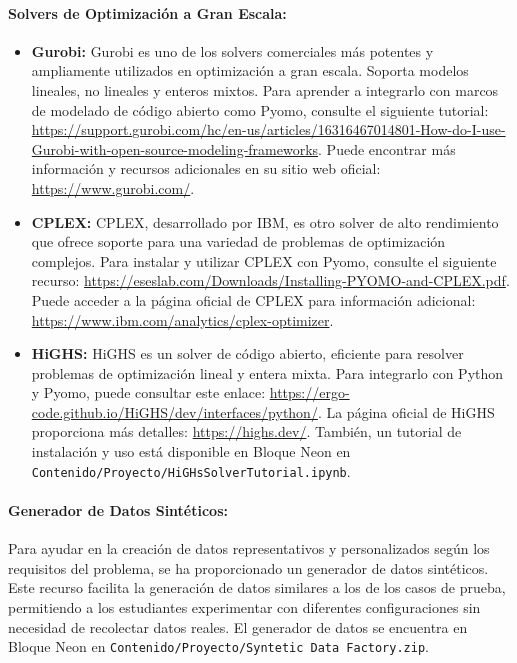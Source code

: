 \documentclass[12pt]{article}
\begin{document}
\paragraph{Solvers de Optimización a Gran Escala:}
\begin{itemize}
    \item \textbf{Gurobi:} Gurobi es uno de los solvers comerciales más potentes y ampliamente utilizados en optimización a gran escala. Soporta modelos lineales, no lineales y enteros mixtos. Para aprender a integrarlo con marcos de modelado de código abierto como Pyomo, consulte el siguiente tutorial: \url{https://support.gurobi.com/hc/en-us/articles/16316467014801-How-do-I-use-Gurobi-with-open-source-modeling-frameworks}. Puede encontrar más información y recursos adicionales en su sitio web oficial: \url{https://www.gurobi.com/}.
    
    \item \textbf{CPLEX:} CPLEX, desarrollado por IBM, es otro solver de alto rendimiento que ofrece soporte para una variedad de problemas de optimización complejos. Para instalar y utilizar CPLEX con Pyomo, consulte el siguiente recurso: \url{https://eseslab.com/Downloads/Installing-PYOMO-and-CPLEX.pdf}. Puede acceder a la página oficial de CPLEX para información adicional: \url{https://www.ibm.com/analytics/cplex-optimizer}.
    
    \item \textbf{HiGHS:} HiGHS es un solver de código abierto, eficiente para resolver problemas de optimización lineal y entera mixta. Para integrarlo con Python y Pyomo, puede consultar este enlace: \url{https://ergo-code.github.io/HiGHS/dev/interfaces/python/}. La página oficial de HiGHS proporciona más detalles: \url{https://highs.dev/}. También, un tutorial de instalación y uso está disponible en Bloque Neon en \texttt{Contenido/Proyecto/HiGHsSolverTutorial.ipynb}.
\end{itemize}

\paragraph{Generador de Datos Sintéticos:} 

Para ayudar en la creación de datos representativos y personalizados según los requisitos del problema, se ha proporcionado un generador de datos sintéticos. Este recurso facilita la generación de datos similares a los de los casos de prueba, permitiendo a los estudiantes experimentar con diferentes configuraciones sin necesidad de recolectar datos reales. El generador de datos se encuentra en Bloque Neon en \texttt{Contenido/Proyecto/Syntetic Data Factory.zip}.
\end{document}
